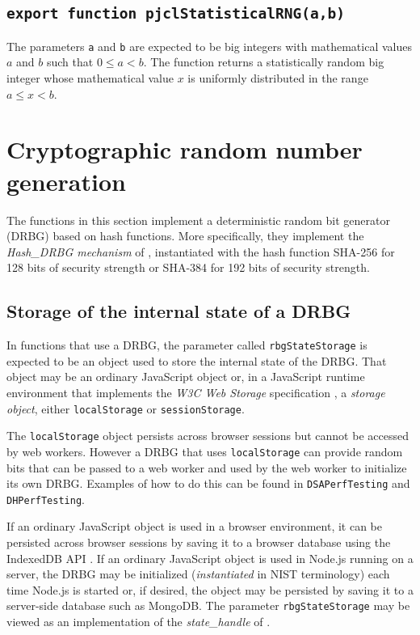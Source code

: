 \documentclass[12pt]{article}
\begin{document}
\subsection{\tt export function pjclStatisticalRNG(a,b)}

The parameters {\tt a} and {\tt b} are expected to be big integers
with mathematical values $a$ and $b$ such that $0 \leq a < b$.  The
function returns a statistically random big integer whose mathematical
value $x$ is uniformly distributed in the range $a \leq x < b$.

\section{Cryptographic random number generation}
\label{s:cryptorandom}

The functions in this section implement a deterministic random bit
generator (DRBG) based on hash functions.  More specifically, they
implement the {\em Hash\_DRBG mechanism\/} of
\cite[\S~10.1.1]{SP800-90Ar1}, instantiated with the hash function SHA-256 for
128 bits of security strength or SHA-384 for 192 bits of security
strength.  

\subsection{Storage of the internal state of a DRBG}
\label{s:rbgstate}

In functions that use a DRBG, the parameter called {\tt rbgStateStorage}
is expected to be an object used to store the internal state of the DRBG.
That object may be an ordinary JavaScript object or, in
a JavaScript runtime environment that implements the {\em W3C Web
  Storage} specification \cite{local-storage}, a {\em storage object},
either {\tt localStorage} or {\tt sessionStorage}.

The {\tt localStorage} object persists across browser sessions but 
cannot be accessed by web workers.  However a DRBG that uses 
{\tt localStorage} can provide random bits that can be passed to a web 
worker and used by the web worker to initialize its own DRBG.
Examples of how to do this can be found in 
{\tt DSAPerfTesting} and {\tt DHPerfTesting}.

If an ordinary JavaScript object is used in a browser environment,
it can be persisted across browser sessions by saving it to a browser
database using the IndexedDB API \cite{indexeddb-api}.
If an ordinary JavaScript object is used in Node.js running on a server, 
the DRBG may be initialized ({\em instantiated\/}
in NIST terminology) each time Node.js is started or,
if desired, the object may be persisted by saving it to a server-side
database such as MongoDB.
The parameter {\tt rbgStateStorage} may be viewed as an implementation
of the {\em state\_handle\/} of \cite{SP800-90Ar1}.
\end{document}
